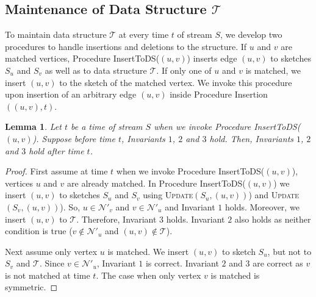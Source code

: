 \documentclass[11pt,letter]{article}
\newtheorem{lemma}[theorem]{Lemma}
\begin{document}
\subsection{Maintenance of Data Structure $\mathcal{T}$}
To maintain data structure $\mathcal{T}$ at every time $t$ of stream $S$,
we develop two procedures to handle insertions and deletions to the
structure.
If $u$ and $v$ are  matched vertices,
Procedure {\sf InsertToDS($(u,v)$)} inserts edge $(u,v)$
to sketches $S_u$ and $S_v$ as well as to data structure $\mathcal{T}$.
If only one of $u$ and $v$ is matched, we insert $(u,v)$
to the sketch of the matched vertex.
We invoke this procedure upon insertion of an arbitrary edge $(u,v)$
inside Procedure {\sf Insertion$((u,v),t)$}.



\begin{center}
\end{center}





\begin{lemma}
 \label{lem:timestamps:case:2}
Let $t$ be a time of stream $S$ when we invoke Procedure {\sf InsertToDS($(u,v)$)}.
Suppose before time $t$, Invariants $1$, $2$ and $3$ hold.
Then, Invariants $1$, $2$ and $3$ hold after time $t$.
\end{lemma}

\begin{proof}
First assume at time $t$ when we invoke Procedure {\sf InsertToDS($(u,v)$)},
vertices $u$ and $v$ are already matched.
In Procedure {\sf InsertToDS($(u,v)$)} we insert $(u,v)$ to sketches
$S_u$ and $S_v$ using \textsc{Update}$(S_{u}, (u,v))$)
and \textsc{Update}$(S_{v}, (u,v))$).
So, $u\in \mathcal{N}'_v$ and $v\in \mathcal{N}'_u$ and  Invariant $1$ holds.
Moreover, we insert $(u,v)$ to $\mathcal{T}$.
Therefore, Invariant $3$ holds.
Invariant $2$ also holds as
neither condition is true ($v\notin \mathcal{N}'_u$ and $(u,v)\notin\mathcal{T}$).

Next assume only vertex $u$ is matched.
We insert $(u,v)$ to sketch $S_u$, but not to $S_v$ and $\mathcal{T}$.
Since $v\in \mathcal{N}'_u$, Invariant $1$ is correct.
Invariant $2$ and $3$ are correct as $v$ is not matched at time $t$.
The case when only vertex $v$ is matched is symmetric.
\end{proof}
\end{document}
